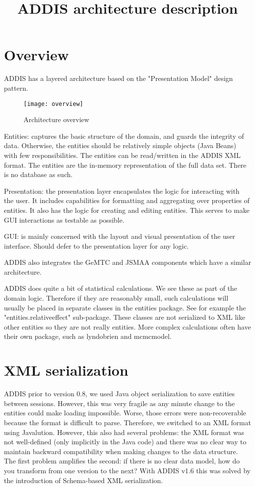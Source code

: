 \documentclass[a4paper]{article}
\title{ADDIS architecture description}
\begin{document}
\maketitle

\section{Overview}

ADDIS has a layered architecture based on the "Presentation Model" design pattern.

\begin{figure}[h]
\centering
\texttt{[image: overview]}
\caption{Architecture overview}
\end{figure}

Entities: captures the basic structure of the domain, and guards the integrity of data.
Otherwise, the entities should be relatively simple objects (Java Beans) with few responsibilities.
The entities can be read/written in the ADDIS XML format.
The entities are the in-memory representation of the full data set.
There is no database as such.

Presentation: the presentation layer encapsulates the logic for interacting with the user.
It includes capabilities for formatting and aggregating over properties of entities.
It also has the logic for creating and editing entities.
This serves to make GUI interactions as testable as possible.

GUI: is mainly concerned with the layout and visual presentation of the user interface.
Should defer to the presentation layer for any logic.

ADDIS also integrates the GeMTC and JSMAA components which have a similar architecture.

ADDIS does quite a bit of statistical calculations.
We see these as part of the domain logic.
Therefore if they are reasonably small, such calculations will usually be placed in separate classes in the entities package.
See for example the "entities.relativeeffect" sub-package.
These classes are not serialized to XML like other entities so they are not really entities.
More complex calculations often have their own package, such as lyndobrien and mcmcmodel.

\section{XML serialization}

ADDIS prior to version 0.8, we used Java object serialization to save entities between sessions.
However, this was very fragile as any minute change to the entities could make loading impossible.
Worse, those errors were non-recoverable because the format is difficult to parse.
Therefore, we switched to an XML format using Javalution.
However, this also had several problems: the XML format was not well-defined (only implicitly in the Java code) and there was no clear way to maintain backward compatibility when making changes to the data structure.
The first problem amplifies the second: if there is no clear data model, how do you transform from one version to the next?
With ADDIS v1.6 this was solved by the introduction of Schema-based XML serialization.
\end{document}
